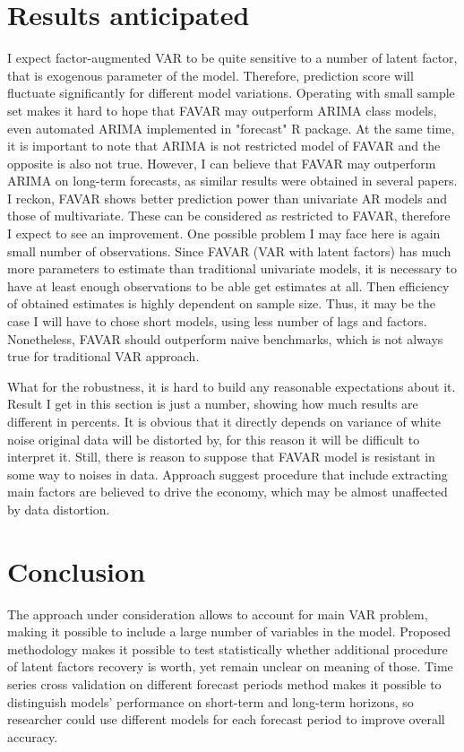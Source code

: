 \documentclass[a4paper, 14pt]{article}
\begin{document}
\section*{Results anticipated}

I expect factor-augmented VAR to be quite sensitive to a number of latent factor, that is exogenous parameter of the model. Therefore, prediction score will fluctuate significantly for different model variations. Operating with small sample set makes it hard to hope that FAVAR may outperform ARIMA class models, even automated ARIMA implemented in "forecast" R package. At the same time, it is important to note that ARIMA is not restricted model of FAVAR and the opposite is also not true. However, I can believe that FAVAR may outperform ARIMA on long-term forecasts, as similar results were obtained in several papers. I reckon, FAVAR shows better prediction power than univariate AR models and those of multivariate. These can be considered as restricted to FAVAR, therefore I expect to see an improvement. One possible problem I may face here is again small number of observations. Since FAVAR (VAR with latent factors) has much more parameters to estimate than traditional univariate models, it is necessary to have at least enough observations to be able get estimates at all. Then efficiency of obtained estimates is highly dependent on sample size. Thus, it may be the case I will have to chose short models, using less number of lags and factors. Nonetheless, FAVAR should outperform naive benchmarks, which is not always true for traditional VAR approach.

What for the robustness, it is hard to build any reasonable expectations about it. Result I get in this section is just a number, showing how much results are different in percents. It is obvious that it directly depends on variance of white noise original data will be distorted by, for this reason it will be difficult to interpret it. Still, there is reason to suppose that FAVAR model is resistant in some way to noises in data. Approach suggest procedure that include extracting main factors are believed to drive the economy, which may be almost unaffected by data distortion. 

\section*{Conclusion}
The approach under consideration allows to account for main VAR problem, making it possible to include a large number of variables in the model. Proposed methodology makes it possible to test statistically whether additional procedure of latent factors recovery is worth, yet remain unclear on meaning of those. Time series cross validation on different forecast periods method makes it possible to distinguish models' performance on short-term and long-term horizons, so researcher could use different models for each forecast period to improve overall accuracy. 
\end{document}
